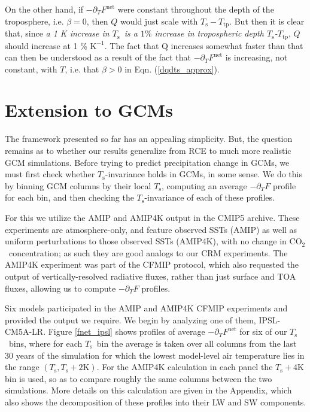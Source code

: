 \documentclass[10pt]{article}
\newcommand{\eqnref}[1]{(\ref{#1})}
\newcommand{\ppt}{\ensuremath{\partial_T}}
\newcommand{\cotwo}{\ensuremath{\mathrm{CO_2}}}
\newcommand{\Fnet}{\ensuremath{F^\mathrm{net}}}
\newcommand{\Ts}{\ensuremath{T_\mathrm{s}}}
\newcommand{\Ttp}{\ensuremath{T_\mathrm{tp}}}
\newcommand{\Kinverse}{\ensuremath{\mathrm{K^{-1}}}}
\newcommand{\Kelvin}{\ensuremath{\mathrm{K}}}
\begin{document}
On the other hand, if $-\ppt \Fnet$ were constant throughout the depth of the troposphere, i.e. $\beta=0$, then $Q$ would just scale with $\Ts-\Ttp$. But then it is clear that, since \emph{a 1 K increase in \Ts\  is a $1\%$ increase in tropospheric depth \Ts-\Ttp}, $Q$ should increase at 1 \% \Kinverse. The fact that Q increases somewhat faster than that can then be understood as a result of the fact that $-\ppt \Fnet$ is increasing, not constant, with $T$, i.e. that $\beta>0$ in Eqn. \eqnref{dqdts_approx}.


\section{Extension to GCMs} \label{sec_GCMs}
The framework presented so far has an appealing simplicity. But, the question remains as to whether our results generalize from RCE to much more realistic GCM simulations. Before trying to predict precipitation change in GCMs,  we must first check  whether \Ts-invariance holds in GCMs, in some sense. We do this by binning  GCM columns by their local \Ts, computing an average $-\ppt F$ profile for each bin, and then checking the \Ts-invariance of each of these profiles. 

For this we utilize the AMIP and AMIP4K  output in the CMIP5 archive. These experiments are atmosphere-only, and feature observed SSTs (AMIP) as well as uniform perturbations to those observed SSTs (AMIP4K), with no change in \cotwo\ concentration; as such they are good analogs to our CRM experiments. The AMIP4K experiment was part of the CFMIP protocol, which also requested the output of vertically-resolved radiative fluxes, rather than just surface and TOA fluxes, allowing us to compute $-\ppt F$ profiles.

Six models participated in the AMIP and AMIP4K CFMIP experiments and provided the output we require. We begin by analyzing one of them, IPSL-CM5A-LR. Figure \ref{fnet_ipsl} shows  profiles of average $-\ppt \Fnet$ for six of our \Ts\ bins, where for each \Ts\ bin the average is taken over  all columns from the last 30 years of the simulation for which the lowest model-level air temperature lies in the range $(\Ts,\Ts +2\Kelvin)$. For the AMIP4K calculation in each panel the $\Ts +4\Kelvin$ bin is used, so as to compare roughly the same columns between the two simulations. More details on this calculation are given in the Appendix, which also shows the decomposition of these profiles into their LW and SW components. 
\end{document}
